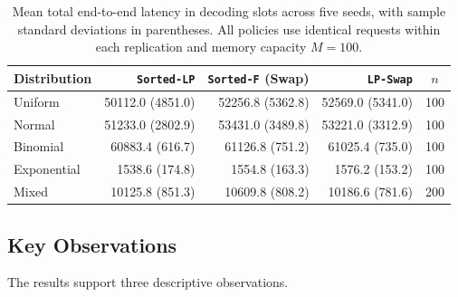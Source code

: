 \documentclass[nonblindrev]{informs3_hide}
\newcommand{\sortF}{\texttt{Sorted-F}}
\newcommand{\sortLP}{\texttt{Sorted-LP}}
\newcommand{\LPSwap}{\texttt{LP-Swap}}
\begin{document}
\begin{table}[htbp]
\centering
\caption{Mean total end-to-end latency in decoding slots across
five seeds, with sample standard deviations in parentheses.
All policies use identical requests within each replication and
memory capacity $M=100$.}
\label{tab:sim_results}
\small
\begin{tabular}{lrrrc}
\toprule
Distribution & \sortLP{} & \sortF{} (Swap) & \LPSwap{} & $n$ \\
\midrule
Uniform
& 50112.0 (4851.0)
& 52256.8 (5362.8)
& 52569.0 (5341.0)
& 100 \\
Normal
& 51233.0 (2802.9)
& 53431.0 (3489.8)
& 53221.0 (3312.9)
& 100 \\
Binomial
& 60883.4 (616.7)
& 61126.8 (751.2)
& 61025.4 (735.0)
& 100 \\
Exponential
& 1538.6 (174.8)
& 1554.8 (163.3)
& 1576.2 (153.2)
& 100 \\
Mixed
& 10125.8 (851.3)
& 10609.8 (808.2)
& 10186.6 (781.6)
& 200 \\
\bottomrule
\end{tabular}
\end{table}

\subsection*{Key Observations}

The results support three descriptive observations.
\end{document}
